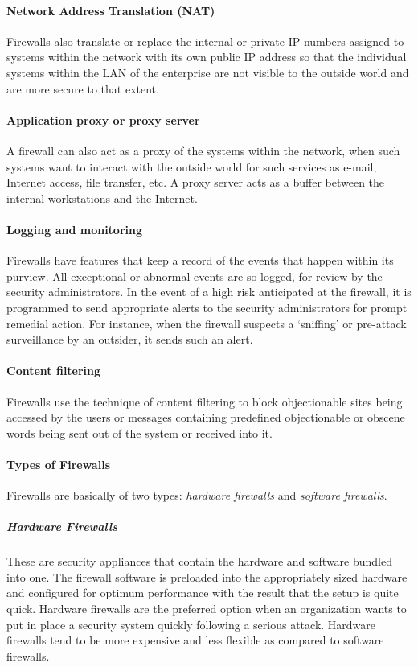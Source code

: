 \paragraph*{Network Address Translation (NAT)}
Firewalls also translate or replace the
internal or private IP numbers assigned to systems within the network with its
own public IP address so that the individual systems within the LAN of the
enterprise are not visible to the outside world and are more secure to that extent.

\paragraph*{Application proxy or proxy server}
A firewall can also act as a proxy of the
systems within the network, when such systems want to interact with the outside
world for such services as e-mail, Internet access, file transfer, etc. A proxy server
acts as a buffer between the internal workstations and the Internet.

\paragraph*{Logging and monitoring}
Firewalls have features that keep a record of the
events that happen within its purview. All exceptional or abnormal events are so
logged, for review by the security administrators. In the event of a high risk anticipated at the firewall, it is programmed to send appropriate alerts to the
security administrators for prompt remedial action. For instance, when the
firewall suspects a ‘sniffing’ or pre-attack surveillance by an outsider, it sends such an alert.

\paragraph*{Content filtering}
Firewalls use the technique of content filtering to block
objectionable sites being accessed by the users or messages containing predefined
objectionable or obscene words being sent out of the system or received into it.

\paragraph{Types of Firewalls}
Firewalls are basically of two types: \textit{hardware firewalls} and \textit{software firewalls}.

\subparagraph{Hardware Firewalls}
These are security appliances that contain the hardware and
software bundled into one. The firewall software is preloaded into the appropriately sized
hardware and configured for optimum performance with the result that the setup is quite
quick. Hardware firewalls are the preferred option when an organization wants to put in
place a security system quickly following a serious attack. Hardware firewalls tend to be
more expensive and less flexible as compared to software firewalls.

